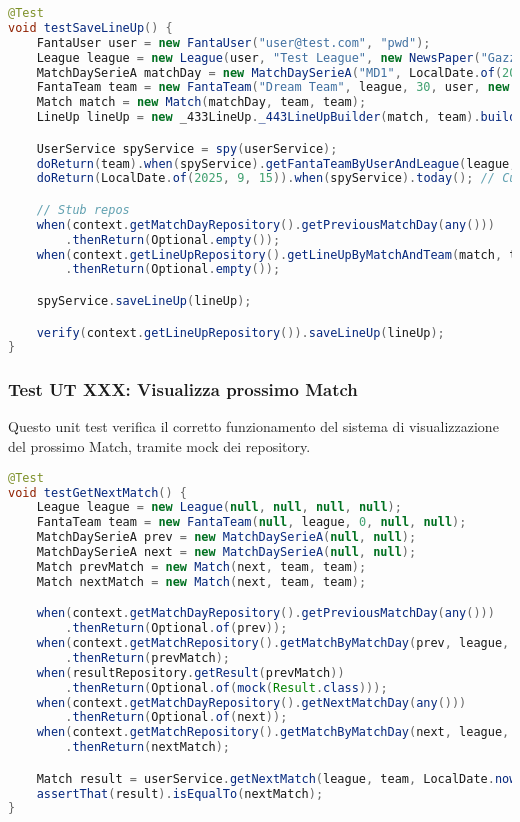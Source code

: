 \begin{lstlisting}[language=Java]
@Test
void testSaveLineUp() {
	FantaUser user = new FantaUser("user@test.com", "pwd");
	League league = new League(user, "Test League", new NewsPaper("Gazzetta"), "L003");
	MatchDaySerieA matchDay = new MatchDaySerieA("MD1", LocalDate.of(2025, 9, 15)); // Monday
	FantaTeam team = new FantaTeam("Dream Team", league, 30, user, new HashSet<>());
	Match match = new Match(matchDay, team, team);
	LineUp lineUp = new _433LineUp._443LineUpBuilder(match, team).build();

	UserService spyService = spy(userService);
	doReturn(team).when(spyService).getFantaTeamByUserAndLeague(league, user);
	doReturn(LocalDate.of(2025, 9, 15)).when(spyService).today(); // Current Monday

	// Stub repos
	when(context.getMatchDayRepository().getPreviousMatchDay(any()))
        .thenReturn(Optional.empty());
	when(context.getLineUpRepository().getLineUpByMatchAndTeam(match, team))
        .thenReturn(Optional.empty());

	spyService.saveLineUp(lineUp);

	verify(context.getLineUpRepository()).saveLineUp(lineUp);
}
\end{lstlisting}


\subsubsection{Test UT XXX: Visualizza prossimo Match} \label{UT10}

Questo unit test verifica il corretto funzionamento del sistema di visualizzazione del prossimo Match,
tramite mock dei repository.

\begin{lstlisting}[language=Java]
@Test
void testGetNextMatch() {
    League league = new League(null, null, null, null);
	FantaTeam team = new FantaTeam(null, league, 0, null, null);
	MatchDaySerieA prev = new MatchDaySerieA(null, null);
	MatchDaySerieA next = new MatchDaySerieA(null, null);
	Match prevMatch = new Match(next, team, team);
	Match nextMatch = new Match(next, team, team);

	when(context.getMatchDayRepository().getPreviousMatchDay(any()))
        .thenReturn(Optional.of(prev));
	when(context.getMatchRepository().getMatchByMatchDay(prev, league, team))
        .thenReturn(prevMatch);
	when(resultRepository.getResult(prevMatch))
        .thenReturn(Optional.of(mock(Result.class)));
	when(context.getMatchDayRepository().getNextMatchDay(any()))
        .thenReturn(Optional.of(next));
	when(context.getMatchRepository().getMatchByMatchDay(next, league, team))
        .thenReturn(nextMatch);

	Match result = userService.getNextMatch(league, team, LocalDate.now());
	assertThat(result).isEqualTo(nextMatch);
}
\end{lstlisting}


